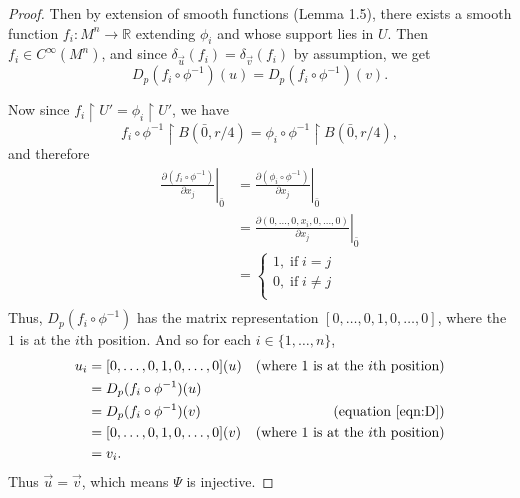 \documentclass{article}
\begin{document}
\begin{enumerate}[label={\bf Q\arabic*:}]
\begin{enumerate}
\begin{proof}
          Then by extension of smooth functions (Lemma 1.5), there exists a
          smooth function $f_i:M^n\rightarrow\mathbb{R}$ extending $\phi_i$
          and whose support lies in $U$. Then $f_i\in C^\infty(M^n)$, and
          since $\delta_{\vec{u}}(f_i)=\delta_{\vec{v}}(f_i)$ by assumption,
          we get
          \begin{equation} \label{eqn:D}
            D_p(f_i\circ\phi^{-1})(u)= D_p(f_i\circ\phi^{-1})(v).
          \end{equation}

          Now since $f_i\restriction U'=\phi_i\restriction U'$, we have
          \[f_i\circ\phi^{-1}\restriction B(\bar{0},r/4)=
          \phi_i\circ\phi^{-1}\restriction B(\bar{0},r/4),\]
          and therefore
          \begin{align*}
            \left.\frac{\partial(f_i\circ\phi^{-1})}{\partial
              x_j}\right\rvert_{\bar{0}} &=
              \left.\frac{\partial(\phi_i\circ\phi^{-1})}{\partial
              x_j}\right\rvert_{\bar{0}} \\
            &=\left.\frac{\partial(0,\ldots,0,x_i,0,\ldots,0)}{\partial
              x_j}\right\rvert_{\bar{0}} \\
            &=\begin{cases}
              1,\; \text{if}\; i=j \\
              0,\; \text{if}\; i\neq j \\
            \end{cases} \\
          \end{align*}
          Thus, $D_p(f_i\circ\phi^{-1})$ has the matrix representation
          $[0,\ldots,0,1,0,\ldots,0]$, where the $1$ is at the $i$th
          position. And so for each $i\in\{1,\ldots,n\}$,
          \begin{align*}
            u_i &=[0,\ldots,0,1,0,\ldots,0](u) &(\text{where 1 is at the
              $i$th position}) \\
              &=D_p(f_i\circ\phi^{-1})(u) \\
              &=D_p(f_i\circ\phi^{-1})(v) &(\text{equation~\ref{eqn:D}}) \\
              &=[0,\ldots,0,1,0,\ldots,0](v) &(\text{where 1 is at the
              $i$th position}) \\
              &=v_i.
          \end{align*}
          Thus $\vec{u}=\vec{v}$, which means $\Psi$ is injective.
        \end{proof}


\end{enumerate}
\end{enumerate}
\end{document}
